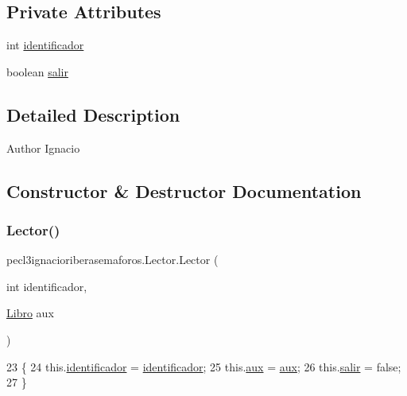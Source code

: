 \subsection*{Private Attributes}
\begin{DoxyCompactItemize}
\item 
int \mbox{\hyperlink{classpecl3ignacioriberasemaforos_1_1_lector_a63b92fb248e0937e631b8c140de16562}{identificador}}
\item 
boolean \mbox{\hyperlink{classpecl3ignacioriberasemaforos_1_1_lector_a9ddf4d7dbf4e433502e0df3ea9862eaf}{salir}}
\end{DoxyCompactItemize}


\subsection{Detailed Description}
\begin{DoxyAuthor}{Author}
Ignacio 
\end{DoxyAuthor}


\subsection{Constructor \& Destructor Documentation}
\mbox{\label{classpecl3ignacioriberasemaforos_1_1_lector_ad076c2c27e64d56da720712f78da2773}} 
\subsubsection{\texorpdfstring{Lector()}{Lector()}}
{\footnotesize\ttfamily pecl3ignacioriberasemaforos.\+Lector.\+Lector (\begin{DoxyParamCaption}\item[{int}]{identificador,  }\item[{\mbox{\hyperlink{classpecl3ignacioriberasemaforos_1_1_libro}{Libro}}}]{aux }\end{DoxyParamCaption})\hspace{0.3cm}{\ttfamily [inline]}}


\begin{DoxyCode}
23      \{
24          this.\mbox{\hyperlink{classpecl3ignacioriberasemaforos_1_1_lector_a63b92fb248e0937e631b8c140de16562}{identificador}} = \mbox{\hyperlink{classpecl3ignacioriberasemaforos_1_1_lector_a63b92fb248e0937e631b8c140de16562}{identificador}};
25          this.\mbox{\hyperlink{classpecl3ignacioriberasemaforos_1_1_lector_a3fc7cbee0daccfbbb55d9922817b438a}{aux}} = \mbox{\hyperlink{classpecl3ignacioriberasemaforos_1_1_lector_a3fc7cbee0daccfbbb55d9922817b438a}{aux}};
26          this.\mbox{\hyperlink{classpecl3ignacioriberasemaforos_1_1_lector_a9ddf4d7dbf4e433502e0df3ea9862eaf}{salir}} = \textcolor{keyword}{false};
27      \}
\end{DoxyCode}


